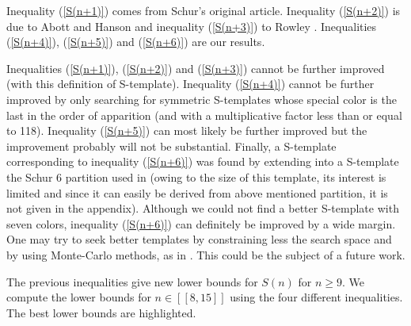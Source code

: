 Inequality (\ref{S(n+1)}) comes from  Schur's original article\cite{Schur1917}. Inequality (\ref{S(n+2)}) is due to
Abott and Hanson \cite{AbbottHanson} and inequality (\ref{S(n+3)}) to Rowley \cite{RowleyRamsey}. Inequalities 
(\ref{S(n+4)}), (\ref{S(n+5)}) and (\ref{S(n+6)}) are our results.

\par
Inequalities (\ref{S(n+1)}), (\ref{S(n+2)}) and (\ref{S(n+3)}) cannot be further improved (with this definition of S-template). 
Inequality (\ref{S(n+4)}) cannot be further improved by only searching for symmetric S-templates whose special color is the 
last in the order of apparition (and with a multiplicative factor less than or equal to 118). Inequality (\ref{S(n+5)}) can most 
likely be further improved but the improvement probably will not be substantial. Finally, a S-template corresponding to inequality 
(\ref{S(n+6)}) was found by extending into a S-template the Schur 6 partition used in \cite{rowley2021improved} (owing to the 
size of this template, its interest is limited and since it can easily be derived from above mentioned partition, it is not given in 
the appendix). Although we could not find a better S-template with seven colors, inequality (\ref{S(n+6)}) can definitely be 
improved by a wide margin. One may try to seek better templates by constraining less the search space and by using Monte-Carlo 
methods, as in \cite{Bouzy2015AnAP}. This could be the subject of a future work.

\par
The previous inequalities give new lower bounds for \(S(n)\) for
\( n \geqslant 9 \). We compute the lower
bounds for \( n \in [\![8,15]\!] \) using the four different inequalities. The best lower bounds are highlighted.

\renewcommand{\arraystretch}{0.2}

